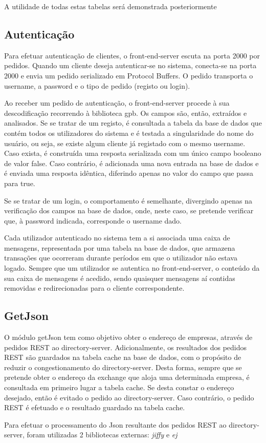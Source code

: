 \documentclass[a4paper,12pt]{article}
\begin{document}
\par A utilidade de todas estas tabelas será demonstrada posteriormente 

\subsection{Autenticação}
Para efetuar autenticação de clientes, o front-end-server escuta na porta 2000 por pedidos. Quando um cliente deseja autenticar-se no sistema, conecta-se na porta 2000 e envia um pedido serializado em Protocol Buffers. O pedido transporta o username, a password e o tipo de pedido (registo ou login).
\par Ao receber um pedido de autenticação, o front-end-server procede à sua descodificação recorrendo à biblioteca gpb. Os campos são, então, extraídos e analisados. Se se tratar de um registo, é consultada a tabela da base de dados que contém todos os utilizadores do sistema e é testada a singularidade do nome do usuário, ou seja, se existe algum cliente já registado com o mesmo username. Caso exista, é construída uma resposta serializada com um único campo booleano de valor false. Caso contrário, é adicionada uma nova entrada na base de dados e é enviada uma resposta idêntica, diferindo apenas no valor do campo que passa para true. 
\par Se se tratar de um login, o comportamento é semelhante, divergindo apenas na verificação dos campos na base de dados, onde, neste caso, se pretende verificar que, à password indicada, corresponde o username dado. 

\par Cada utilizador autenticado no sistema tem a si associada uma caixa de mensagens, representada por uma tabela na base de dados, que armazena transações que ocorreram durante períodos em que o utilizador não estava logado. Sempre que um utilizador se autentica no front-end-server, o conteúdo da sua caixa de mensagens é acedido, sendo quaisquer mensagens aí contidas removidas e  redirecionadas para o cliente correspondente.

\subsection{GetJson}
O módulo getJson tem como objetivo obter o endereço de empresas, através de pedidos REST ao directory-server. Adicionalmente, os resultados dos pedidos REST são guardados na tabela cache na base de dados, com o propósito de reduzir o congestionamento do directory-server. Desta forma, sempre que se pretende obter o endereço da exchange que aloja uma determinada empresa, é consultada em primeiro lugar a tabela cache. Se desta constar o endereço desejado, então é evitado o pedido ao directory-server. Caso contrário, o pedido REST é efetuado e o resultado guardado na tabela cache.
\par Para efetuar o processamento do Json resultante dos pedidos REST ao directory-server, foram utilizadas 2 bibliotecas externas: \textit{jiffy} e \textit{ej} 
\end{document}
